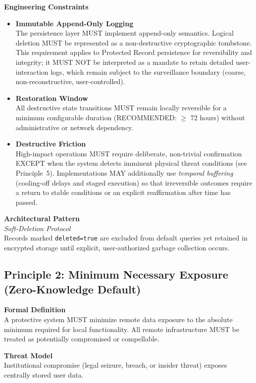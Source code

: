 \documentclass[12pt]{article}
\begin{document}
\textbf{Engineering Constraints}
\begin{itemize}
\item \textbf{Immutable Append-Only Logging}\\
  The persistence layer MUST implement append-only semantics.
  Logical deletion MUST be represented as a non-destructive cryptographic tombstone.
  This requirement applies to Protected Record persistence for reversibility and integrity; it MUST NOT be interpreted as a mandate to retain detailed user-interaction logs, which remain subject to the surveillance boundary (coarse, non-reconstructive, user-controlled).
\item \textbf{Restoration Window}\\
  All destructive state transitions MUST remain locally reversible for a minimum configurable duration
  (RECOMMENDED: $\ge$ 72 hours) without administrative or network dependency.
\item \textbf{Destructive Friction}\\
  High-impact operations MUST require deliberate, non-trivial confirmation
  EXCEPT when the system detects imminent physical threat conditions (see Principle~5).
  Implementations MAY additionally use \emph{temporal buffering} (cooling-off delays and staged execution) so that irreversible outcomes require a return to stable conditions or an explicit reaffirmation after time has passed.
\end{itemize}

\textbf{Architectural Pattern}\\
\emph{Soft-Deletion Protocol}\\
Records marked \texttt{deleted=true} are excluded from default queries yet retained in encrypted storage until explicit, user-authorized garbage collection occurs.

\subsection{Principle 2: Minimum Necessary Exposure (Zero-Knowledge Default)}

\textbf{Formal Definition}\\
A protective system MUST minimize remote data exposure to the absolute minimum required for local functionality.
All remote infrastructure MUST be treated as potentially compromised or compellable.

\textbf{Threat Model}\\
Institutional compromise (legal seizure, breach, or insider threat) exposes centrally stored user data.
\end{document}
